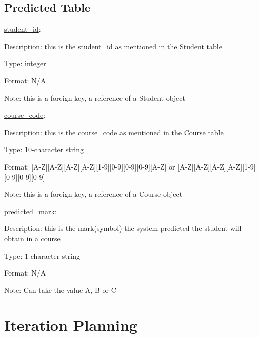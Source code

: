 \documentclass[10pt]{article}
\begin{document}
\subsection{Predicted Table}

\underline{student\_id}:

\begin{description}[font=$\bullet$~\normalfont\scshape\color{red!50!black}]

\item [] Description: this is the student\_id as mentioned in the Student table
\item [] Type: integer
\item [] Format: N/A
\item [] Note: this is a foreign key, a reference of a Student object

\end{description}
\underline{course\_code}:

\begin{description}[font=$\bullet$~\normalfont\scshape\color{red!50!black}]

\item [] Description: this is the course\_code as  mentioned in the Course table
\item [] Type: 10-character string
\item [] Format: [A-Z][A-Z][A-Z][A-Z][1-9][0-9][0-9][0-9][A-Z] or  [A-Z][A-Z][A-Z][A-Z][1-9][0-9][0-9][0-9]
\item [] Note: this is a foreign key, a reference of a Course object

\end{description}
\underline{predicted\_mark}:

\begin{description}[font=$\bullet$~\normalfont\scshape\color{red!50!black}]

\item [] Description: this is the mark(symbol) the system predicted the student will obtain in a course
\item [] Type:  1-character string
\item [] Format: N/A
\item [] Note: Can take the value A, B or C

\end{description}

\section{Iteration Planning}
\end{document}
